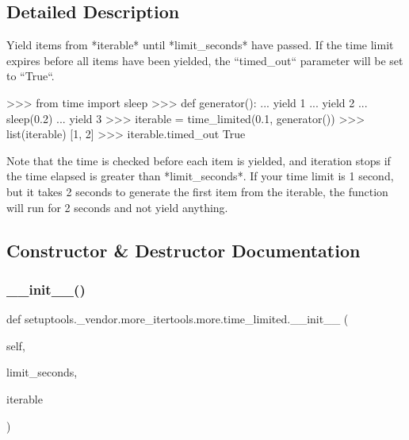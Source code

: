\subsection{Detailed Description}
\begin{DoxyVerb}Yield items from *iterable* until *limit_seconds* have passed.
If the time limit expires before all items have been yielded, the
``timed_out`` parameter will be set to ``True``.

>>> from time import sleep
>>> def generator():
...     yield 1
...     yield 2
...     sleep(0.2)
...     yield 3
>>> iterable = time_limited(0.1, generator())
>>> list(iterable)
[1, 2]
>>> iterable.timed_out
True

Note that the time is checked before each item is yielded, and iteration
stops if  the time elapsed is greater than *limit_seconds*. If your time
limit is 1 second, but it takes 2 seconds to generate the first item from
the iterable, the function will run for 2 seconds and not yield anything.\end{DoxyVerb}
 

\subsection{Constructor \& Destructor Documentation}
\mbox{\label{classsetuptools_1_1__vendor_1_1more__itertools_1_1more_1_1time__limited_a5216044d2d66082b691e81ff550f5852}} 
\subsubsection{\texorpdfstring{\+\_\+\+\_\+init\+\_\+\+\_\+()}{\_\_init\_\_()}}
{\footnotesize\ttfamily def setuptools.\+\_\+vendor.\+more\+\_\+itertools.\+more.\+time\+\_\+limited.\+\_\+\+\_\+init\+\_\+\+\_\+ (\begin{DoxyParamCaption}\item[{}]{self,  }\item[{}]{limit\+\_\+seconds,  }\item[{}]{iterable }\end{DoxyParamCaption})}



